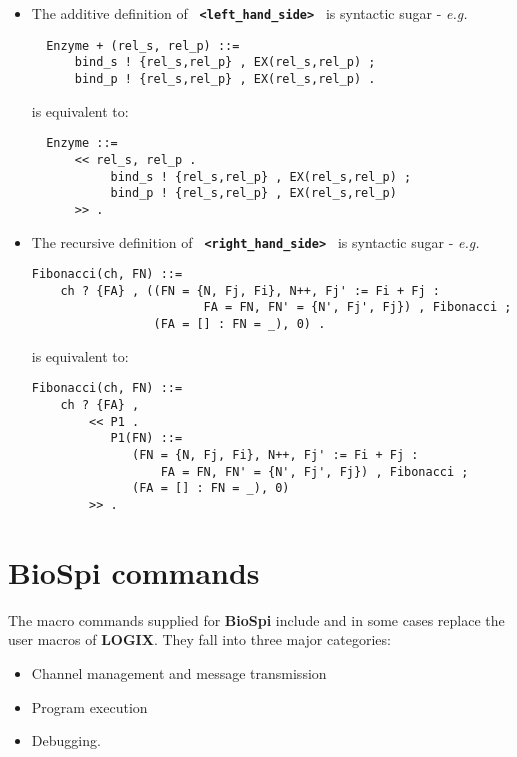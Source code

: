 \documentclass[twoside,10pt]{report}
\begin{document}
\begin{itemize}
\item
The additive definition of {\bf \verb+ <left_hand_side> +} is syntactic sugar
- {\em e.g.}

\begin{verbatim}
  Enzyme + (rel_s, rel_p) ::=
      bind_s ! {rel_s,rel_p} , EX(rel_s,rel_p) ;
      bind_p ! {rel_s,rel_p} , EX(rel_s,rel_p) .
\end{verbatim}

\noindent
is equivalent to:

\begin{verbatim}
  Enzyme ::=
      << rel_s, rel_p .
           bind_s ! {rel_s,rel_p} , EX(rel_s,rel_p) ;
           bind_p ! {rel_s,rel_p} , EX(rel_s,rel_p)
      >> .
\end{verbatim}

\item
The recursive definition of {\bf \verb+ <right_hand_side> +} is syntactic
sugar - {\em e.g.}

\begin{verbatim}
Fibonacci(ch, FN) ::=
    ch ? {FA} , ((FN = {N, Fj, Fi}, N++, Fj' := Fi + Fj : 
                        FA = FN, FN' = {N', Fj', Fj}) , Fibonacci ;
                 (FA = [] : FN = _), 0) .
\end{verbatim}

\noindent
is equivalent to:

\begin{verbatim}
Fibonacci(ch, FN) ::=
    ch ? {FA} ,
        << P1 .
           P1(FN) ::=
              (FN = {N, Fj, Fi}, N++, Fj' := Fi + Fj : 
                  FA = FN, FN' = {N', Fj', Fj}) , Fibonacci ;
              (FA = [] : FN = _), 0)
        >> .
\end{verbatim}
\end{itemize}

\chapter{BioSpi commands}
\label{commands}

The macro commands supplied for {\bf BioSpi} include and in some cases replace
the user macros of {\bf LOGIX}.  They fall into three major
categories:

\begin{itemize}
\item Channel management and message transmission
\item Program execution
\item Debugging.
\end{itemize}
\end{document}

